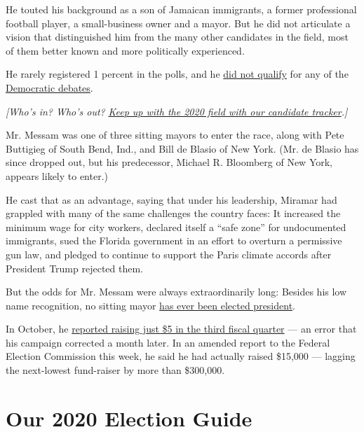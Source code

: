 He touted his background as a son of Jamaican immigrants, a former
professional football player, a small-business owner and a mayor. But he
did not articulate a vision that distinguished him from the many other
candidates in the field, most of them better known and more politically
experienced.

He rarely registered 1 percent in the polls, and he
\href{https://www.nytimes.com/interactive/2019/us/politics/democratic-debate-lineup.html}{did
not qualify} for any of the
\href{https://www.nytimes.com/news-event/democratic-debates}{Democratic
debates}.

\emph{{[}Who's in? Who's out?}
\emph{\href{https://www.nytimes.com/interactive/2019/us/politics/2020-presidential-candidates.html?action=click\&module=inline\&pgtype=Article}{Keep
up with the 2020 field with our candidate tracker}.{]}}

Mr. Messam was one of three sitting mayors to enter the race, along with
Pete Buttigieg of South Bend, Ind., and Bill de Blasio of New York. (Mr.
de Blasio has since dropped out, but his predecessor, Michael R.
Bloomberg of New York, appears likely to enter.)

He cast that as an advantage, saying that under his leadership, Miramar
had grappled with many of the same challenges the country faces: It
increased the minimum wage for city workers, declared itself a ``safe
zone'' for undocumented immigrants, sued the Florida government in an
effort to overturn a permissive gun law, and pledged to continue to
support the Paris climate accords after President Trump rejected them.

But the odds for Mr. Messam were always extraordinarily long: Besides
his low name recognition, no sitting mayor
\href{https://www.nytimes.com/interactive/2019/05/23/us/politics/presidential-experience.html}{has
ever been elected president}.

In October, he
\href{https://www.nytimes.com/2019/10/15/us/politics/wayne-messam-5-dollars.html}{reported
raising just \$5 in the third fiscal quarter} --- an error that his
campaign corrected a month later. In an amended report to the Federal
Election Commission this week, he said he had actually raised \$15,000
--- lagging the next-lowest fund-raiser by more than \$300,000.

\hypertarget{our-2020-election-guide}{%
\section{Our 2020 Election Guide}\label{our-2020-election-guide}}


